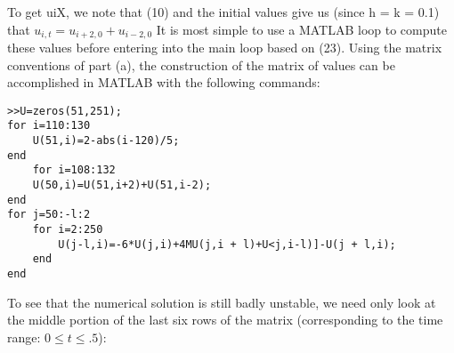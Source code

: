 \documentclass[../main.tex]{subfiles}
\begin{document}
{{To get uiX, we note that (10) and the initial values give us (since h = k = 0.1) that $u_{i,t}=u_{i+2,0}+u_{i-2,0}$ It is most simple to use a MATLAB loop to compute these values before entering into the main loop based on (23). Using the matrix conventions of part (a), the construction of the matrix of values can be accomplished in MATLAB with the following commands:
\begin{lstlisting}[numbers=none,frame=none]
>>U=zeros(51,251); 
for i=110:130 
	U(51,i)=2-abs(i-120)/5; 
end 
	for i=108:132 
	U(50,i)=U(51,i+2)+U(51,i-2); 
end 
for j=50:-l:2 
	for i=2:250 
		U(j-l,i)=-6*U(j,i)+4MU(j,i + l)+U<j,i-l)]-U(j + l,i); 
	end 
end  
\end{lstlisting}
To see that the numerical solution is still badly unstable, we need only look at the 
middle portion of the last six rows of the matrix (corresponding to the time range: 
$0 \leqslant t \leqslant .5$):


}}
\end{document}
